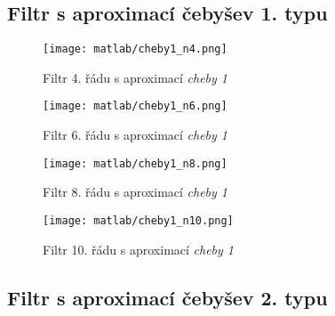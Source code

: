 \documentclass[11pt, a4paper]{article}
\begin{document}
        \subsection{Filtr s aproximací čebyšev 1. typu}
            
            \begin{figure}[H]
                \centering
                \begin{minipage}{.5\textwidth}
                    \centering
                    \texttt{[image: matlab/cheby1\_n4.png]}
                    \caption{Filtr 4. řádu s aproximací \textit{cheby 1}}
                    \label{fig:5}
                \end{minipage}%
                \begin{minipage}{.5\textwidth}
                    \centering
                    \texttt{[image: matlab/cheby1\_n6.png]}
                    \caption{Filtr 6. řádu s aproximací \textit{cheby 1}}
                    \label{fig:6}
                \end{minipage}
            \end{figure}
        
            \begin{figure}[H]
                \centering
                \begin{minipage}{.5\textwidth}
                    \centering
                    \texttt{[image: matlab/cheby1\_n8.png]}
                    \caption{Filtr 8. řádu s aproximací \textit{cheby 1}}
                    \label{fig:7}
                \end{minipage}%
                \begin{minipage}{.5\textwidth}
                    \centering
                    \texttt{[image: matlab/cheby1\_n10.png]}
                    \caption{Filtr 10. řádu s aproximací \textit{cheby 1}}
                    \label{fig:8}
                \end{minipage}
            \end{figure}
        
        \subsection{Filtr s aproximací čebyšev 2. typu}
            
\end{document}
